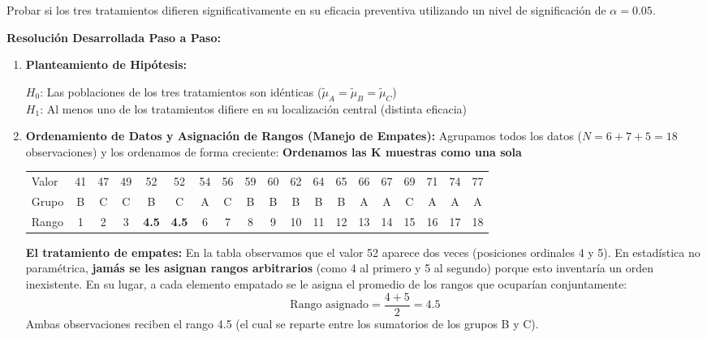 \documentclass[10pt,a4paper]{article}
\begin{document}
Probar si los tres tratamientos difieren significativamente en su eficacia preventiva utilizando un nivel de significación de $\alpha = 0.05$.

\textbf{Resolución Desarrollada Paso a Paso:}
\begin{enumerate}[leftmargin=18pt,itemsep=2pt,topsep=2pt,parsep=0pt]
  \item \textbf{Planteamiento de Hipótesis:}

  $H_0$: Las poblaciones de los tres tratamientos son idénticas ($\tilde{\mu}_A = \tilde{\mu}_B = \tilde{\mu}_C$)\\
  $H_1$: Al menos uno de los tratamientos difiere en su localización central (distinta eficacia)

  \item \textbf{Ordenamiento de Datos y Asignación de Rangos (Manejo de Empates):} Agrupamos todos los datos ($N = 6+7+5 = 18$ observaciones) y los ordenamos de forma creciente: \hfill {\small\textbf{Ordenamos las K muestras como una sola}}

  \begin{center}
  \vspace{-2pt}
  {\small
  \begin{tabular}{l c c c c c c c c c c c c c c c c c c}
  \toprule
  Valor & 41 & 47 & 49 & 52 & 52 & 54 & 56 & 59 & 60 & 62 & 64 & 65 & 66 & 67 & 69 & 71 & 74 & 77 \\
  Grupo & B & C & C & B & C & A & C & B & B & B & B & B & A & A & C & A & A & A \\
  \midrule
  Rango & 1 & 2 & 3 & \textbf{4.5} & \textbf{4.5} & 6 & 7 & 8 & 9 & 10 & 11 & 12 & 13 & 14 & 15 & 16 & 17 & 18 \\
  \bottomrule
  \end{tabular}
  }
  \vspace{-4pt}
  \end{center}

  \begin{tcolorbox}[colback=red!6, colframe=red!70!black, title={\small\bfseries Atención - Error Frecuente}, boxsep=1pt, left=4pt, right=4pt, top=2pt, bottom=2pt]
  {\small
  \textbf{El tratamiento de empates:} En la tabla observamos que el valor 52 aparece dos veces (posiciones ordinales 4 y 5). En estadística no paramétrica, \textbf{jamás se les asignan rangos arbitrarios} (como 4 al primero y 5 al segundo) porque esto inventaría un orden inexistente. En su lugar, a cada elemento empatado se le asigna el promedio de los rangos que ocuparían conjuntamente:
  \[
  \text{Rango asignado} = \frac{4+5}{2} = 4.5
  \]
  Ambas observaciones reciben el rango 4.5 (el cual se reparte entre los sumatorios de los grupos B y C).
  }
  \end{tcolorbox}


\end{enumerate}
\end{document}
